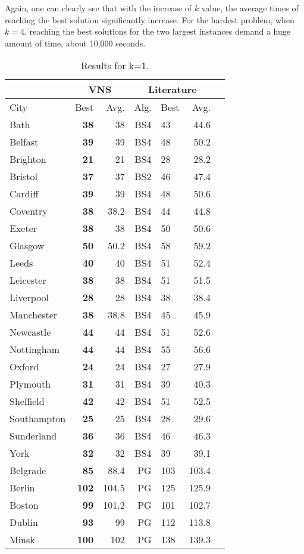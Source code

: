 \documentclass[dvipsnames,format=sigconf,anonymous=true,review=true]{acmart}
\begin{document}
\begin{itemize}
   		Again, one can clearly see that with the increase of $k$ value, the average times of reaching the best solution significantly increase. For the hardest problem, when $k=4$, reaching the best solutions for the two largest instances demand a huge amount of time, about 10,000 seconds. %
   \end{itemize}
 

 
 
  \begin{table}
  	\caption{Results for k=1.}
  	\label{tab:k1}  
 	\begin{tabular}{l|rr|rlrr}
 	\hline
 	\multicolumn{1}{c}{ } & \multicolumn{2}{|c}{VNS} & \multicolumn{3}{|c}{Literature} \\
 	\hline
	City & Best & Avg. & Alg. & Best & Avg. \\ \hline
	Bath&\bf{38}&38&BS4&43&44.6\\
	Belfast&\bf{39}&39&BS4&48&50.2\\
	Brighton&\bf{21}&21&BS4&28&28.2\\
	Bristol&\bf{37}&37&BS2&46&47.4\\
	Cardiff&\bf{39}&39&BS4&48&50.6\\
	Coventry&\bf{38}&38.2&BS4&44&44.8\\
	Exeter&\bf{38}&38&BS4&50&50.6\\
	Glasgow&\bf{50}&50.2&BS4&58&59.2\\
	Leeds&\bf{40}&40&BS4&51&52.4\\
	Leicester&\bf{38}&38&BS4&51&51.5\\
	Liverpool&\bf{28}&28&BS4&38&38.4\\
	Manchester&\bf{38}&38.8&BS4&45&45.9\\
	Newcastle&\bf{44}&44&BS4&51&52.6\\
	Nottingham&\bf{44}&44&BS4&55&56.6\\
	Oxford&\bf{24}&24&BS4&27&27.9\\
	Plymouth&\bf{31}&31&BS4&39&40.3\\
	Sheffield&\bf{42}&42&BS4&51&52.5\\
	Southampton&\bf{25}&25&BS4&28&29.6\\
	Sunderland&\bf{36}&36&BS4&46&46.3\\
	York&\bf{32}&32&BS4&39&39.1\\  \hline  \hline
	Belgrade&\bf{85}&88.4&PG&103&103.4\\
	Berlin&\bf{102}&104.5&PG&125&125.9\\
	Boston&\bf{99}&101.2&PG&101&102.7\\
	Dublin&\bf{93}&99&PG&112&113.8\\
	Minsk&\bf{100}&102&PG&138&139.3\\
	\hline
	
 	\end{tabular}
 \end{table}
\end{document}
